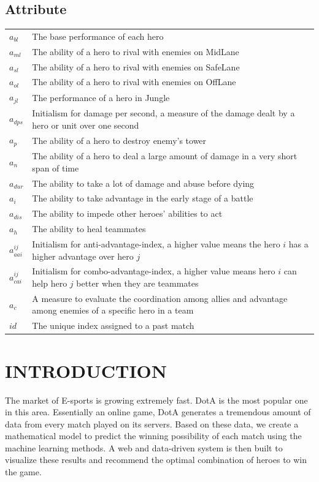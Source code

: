 \documentclass[letterpaper, 10 pt, conference]{ieeeconf}  %
\begin{document}
\subsection*{Attribute}
\begin{supertabular}{p{1.5cm} p{6.4cm}}
$a_{bl}$ & The base performance of each hero\\
$a_{ml}$ & The ability of a hero to rival with enemies on MidLane\\
$a_{sl}$ & The ability of a hero to rival with enemies on SafeLane\\
$a_{ol}$ & The ability of a hero to rival with enemies on OffLane\\
$a_{jl}$ & The performance of a hero in Jungle\\
$a_{dps}$ & Initialism for damage per second, a measure of the damage dealt by a hero or unit over one second\\
$a_{p}$ & The ability of a hero to destroy enemy's tower\\
$a_{n}$ & The ability of a hero to deal a large amount of damage in a very short span of time\\
$a_{dur}$ & The ability to take a lot of damage and abuse before dying\\
$a_{i}$ & The ability to take advantage in the early stage of a battle\\
$a_{dis}$ & The ability to impede other heroes' abilities to act\\
$a_{h}$ & The ability to heal teammates\\
$a_{aai}^{ij}$ & Initialism for anti-advantage-index, a higher value means the hero $i$ has a higher advantage over hero $j$\\
$a_{cai}^{ij}$ & Initialism for combo-advantage-index, a higher value means hero $i$ can help hero $j$ better when they are teammates\\
$a_c$ & A measure to evaluate the coordination among allies and advantage among enemies of a specific hero in a team\\
$id$ & The unique index assigned to a past match\\
\end{supertabular}

\section{INTRODUCTION}

The market of E-sports is growing extremely fast. DotA is the most popular one in this area. Essentially an online game, DotA generates a tremendous amount of data from every match played on its servers. Based on these data, we create a mathematical model to predict the winning possibility of each match using the machine learning methods. A web and data-driven system is then built to visualize these results and recommend the optimal combination of heroes to win the game.
\end{document}
